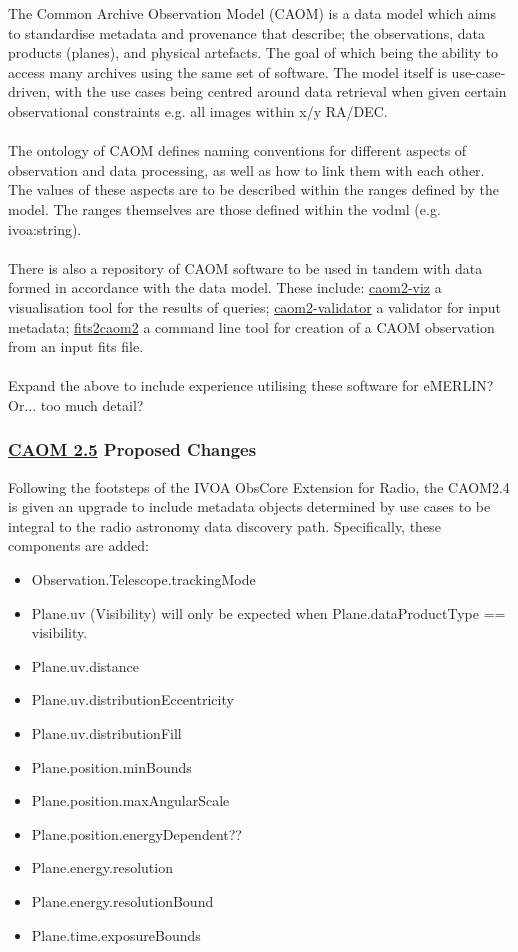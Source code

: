 The Common Archive Observation Model (CAOM) is a data model which aims to standardise metadata and provenance that describe; the observations, data products (planes), and physical artefacts. The goal of which being the ability to access many archives using the same set of software. The model itself is use-case-driven, with the use cases being centred around data retrieval when given certain observational constraints e.g. all images within x/y RA/DEC. 
\\
\\The ontology of CAOM defines naming conventions for different aspects of observation and data processing, as well as how to link them with each other. The values of these aspects are to be described within the ranges defined by the model. The ranges themselves are those defined within the vodml (e.g. ivoa:string). 
\\
\\There is also a repository of CAOM software to be used in tandem with data formed in accordance with the data model. These include: \href{https://github.com/opencadc/caom2/tree/master/caom2-viz}{caom2-viz} a visualisation tool for the results of queries; \href{https://github.com/opencadc/caom2/tree/master/caom2-validator}{caom2-validator} a validator for input metadata; \href{https://github.com/opencadc/caom2/tree/master/fits2caom2}{fits2caom2} a command line tool for creation of a CAOM observation from an input fits file. 
\\
\\Expand the above to include experience utilising these software for eMERLIN?  Or... too much detail? 

\subsubsection{\href{https://confluence.skatelescope.org/display/SRCSC/SP-4397+CAOM-2.5}{CAOM 2.5} Proposed Changes}
Following the footsteps of the IVOA ObsCore Extension for Radio, the CAOM2.4 is given an upgrade to include metadata objects determined by use cases to be integral to the radio astronomy data discovery path.  Specifically, these components are added: 
\begin{itemize}
\item Observation.Telescope.trackingMode
\item Plane.uv (Visibility) will only be expected when Plane.dataProductType == visibility.  
\item Plane.uv.distance 
\item Plane.uv.distributionEccentricity
\item Plane.uv.distributionFill
\item Plane.position.minBounds
\item Plane.position.maxAngularScale
\item Plane.position.energyDependent??
\item Plane.energy.resolution
\item Plane.energy.resolutionBound
\item Plane.time.exposureBounds
\end{itemize}

